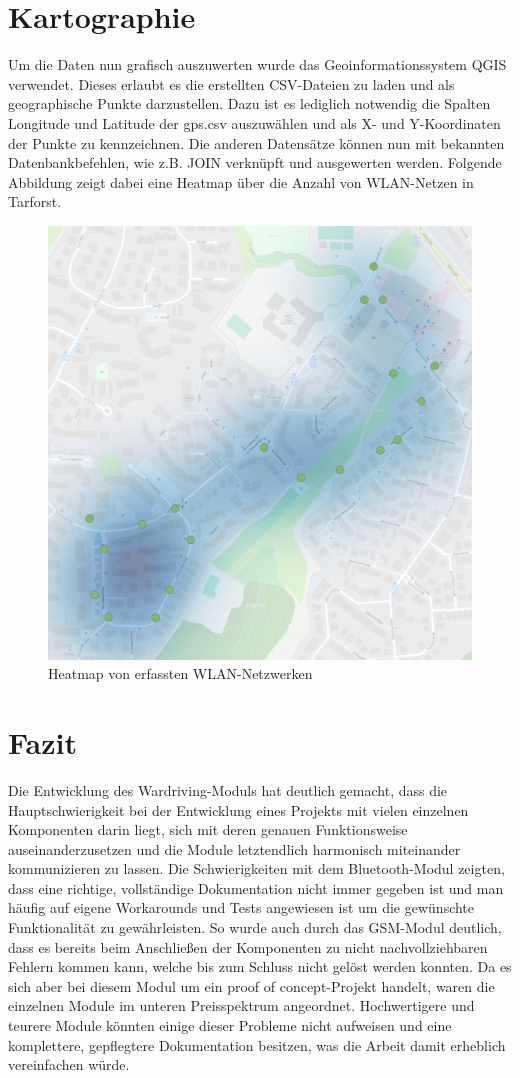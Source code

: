 \documentclass[a4paper,11pt, ngerman]{scrartcl}
\begin{document}
\section{Kartographie}
Um die Daten nun grafisch auszuwerten wurde das Geoinformationssystem \grqq QGIS\grqq{} verwendet. Dieses erlaubt es die erstellten CSV-Dateien zu laden und als geographische Punkte darzustellen. Dazu ist es lediglich notwendig die Spalten \grqq Longitude\grqq{} und \grqq Latitude\grqq{} der gps.csv auszuwählen und als X- und Y-Koordinaten der Punkte zu kennzeichnen. Die anderen Datensätze können nun mit bekannten Datenbankbefehlen, wie z.B. JOIN verknüpft und ausgewerten werden. Folgende Abbildung zeigt dabei eine Heatmap über die Anzahl von WLAN-Netzen in Tarforst.

\begin{figure}[H]
\begin{center}
	\includegraphics[width=.7\linewidth]{map.png}\caption{Heatmap von erfassten WLAN-Netzwerken}
	\end{center}
\end{figure}
\section{Fazit}
Die Entwicklung des Wardriving-Moduls hat deutlich gemacht, dass die Hauptschwierigkeit bei der Entwicklung eines Projekts mit vielen einzelnen Komponenten darin liegt, sich mit deren genauen Funktionsweise auseinanderzusetzen und die Module letztendlich harmonisch miteinander kommunizieren zu lassen. Die Schwierigkeiten mit dem Bluetooth-Modul zeigten, dass eine richtige, vollständige Dokumentation nicht immer gegeben ist und man häufig auf eigene Workarounds und Tests angewiesen ist um die gewünschte Funktionalität zu gewährleisten. 
So wurde auch durch das GSM-Modul deutlich, dass es bereits beim Anschließen der Komponenten zu nicht nachvollziehbaren Fehlern kommen kann, welche bis zum Schluss nicht gelöst werden konnten. Da es sich aber bei diesem Modul um ein \grqq proof of concept\grqq{}-Projekt handelt, waren die einzelnen Module im unteren Preisspektrum angeordnet. Hochwertigere und teurere Module könnten einige dieser Probleme nicht aufweisen und eine komplettere, gepflegtere Dokumentation besitzen, was die Arbeit damit erheblich vereinfachen würde.
\end{document}
